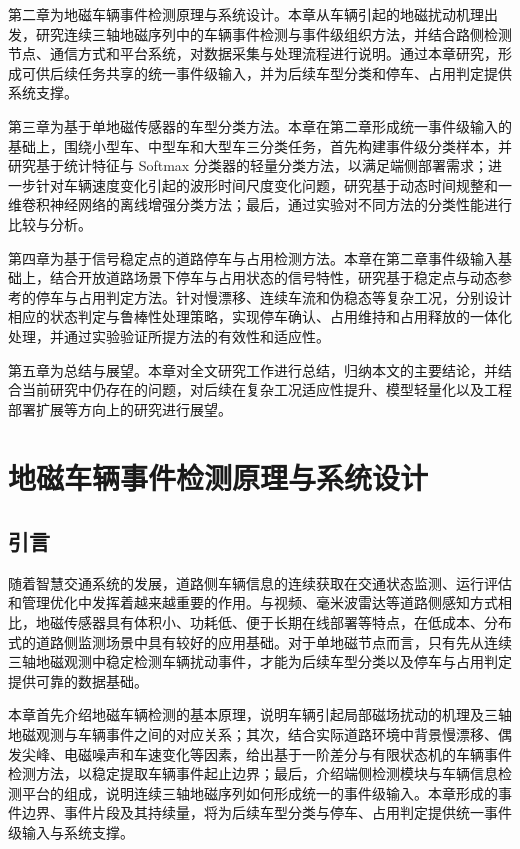 \documentclass{xdupgthesis}
\begin{document}
第二章为地磁车辆事件检测原理与系统设计。本章从车辆引起的地磁扰动机理出发，研究连续三轴地磁序列中的车辆事件检测与事件级组织方法，并结合路侧检测节点、通信方式和平台系统，对数据采集与处理流程进行说明。通过本章研究，形成可供后续任务共享的统一事件级输入，并为后续车型分类和停车、占用判定提供系统支撑。

第三章为基于单地磁传感器的车型分类方法。本章在第二章形成统一事件级输入的基础上，围绕小型车、中型车和大型车三分类任务，首先构建事件级分类样本，并研究基于统计特征与 Softmax 分类器的轻量分类方法，以满足端侧部署需求；进一步针对车辆速度变化引起的波形时间尺度变化问题，研究基于动态时间规整和一维卷积神经网络的离线增强分类方法；最后，通过实验对不同方法的分类性能进行比较与分析。

第四章为基于信号稳定点的道路停车与占用检测方法。本章在第二章事件级输入基础上，结合开放道路场景下停车与占用状态的信号特性，研究基于稳定点与动态参考的停车与占用判定方法。针对慢漂移、连续车流和伪稳态等复杂工况，分别设计相应的状态判定与鲁棒性处理策略，实现停车确认、占用维持和占用释放的一体化处理，并通过实验验证所提方法的有效性和适应性。

第五章为总结与展望。本章对全文研究工作进行总结，归纳本文的主要结论，并结合当前研究中仍存在的问题，对后续在复杂工况适应性提升、模型轻量化以及工程部署扩展等方向上的研究进行展望。








\chapter{地磁车辆事件检测原理与系统设计}
\label{ch:ch2_event_detect}

\section{引言}
\label{sec:ch2_intro}

随着智慧交通系统的发展，道路侧车辆信息的连续获取在交通状态监测、运行评估和管理优化中发挥着越来越重要的作用。与视频、毫米波雷达等道路侧感知方式相比，地磁传感器具有体积小、功耗低、便于长期在线部署等特点，在低成本、分布式的道路侧监测场景中具有较好的应用基础\cite{wang2018roadside}。对于单地磁节点而言，只有先从连续三轴地磁观测中稳定检测车辆扰动事件，才能为后续车型分类以及停车与占用判定提供可靠的数据基础。

本章首先介绍地磁车辆检测的基本原理，说明车辆引起局部磁场扰动的机理及三轴地磁观测与车辆事件之间的对应关系；其次，结合实际道路环境中背景慢漂移、偶发尖峰、电磁噪声和车速变化等因素，给出基于一阶差分与有限状态机的车辆事件检测方法，以稳定提取车辆事件起止边界；最后，介绍端侧检测模块与车辆信息检测平台的组成，说明连续三轴地磁序列如何形成统一的事件级输入。本章形成的事件边界、事件片段及其持续量，将为后续车型分类与停车、占用判定提供统一事件级输入与系统支撑。
\end{document}
